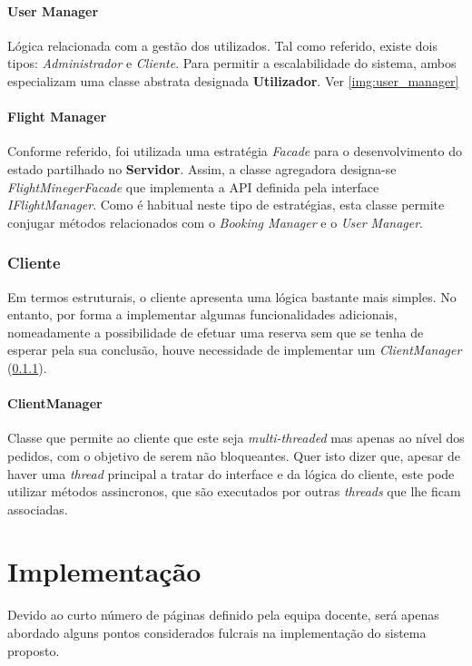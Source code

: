 \documentclass[a4paper,11pt]{scrreprt}
\begin{document}
\subsubsection{User Manager}
Lógica relacionada com a gestão dos utilizados. Tal como referido, existe dois tipos:
\textit{Administrador} e \textit{Cliente}.
Para permitir a escalabilidade do sistema, ambos especializam uma classe abstrata designada
\textbf{Utilizador}. Ver \ref{img:user_manager}

\subsubsection{Flight Manager}
Conforme referido, foi utilizada uma estratégia \textit{Facade} para o desenvolvimento
do estado partilhado no \textbf{Servidor}.
Assim, a classe agregadora designa-se \textit{FlightMinegerFacade} que implementa a API definida
pela interface \textit{IFlightManager}.
Como é habitual neste tipo de estratégias, esta classe permite conjugar métodos relacionados com 
o \textit{Booking Manager} e o \textit{User Manager}.

\subsection{Cliente}
Em termos estruturais, o cliente apresenta uma lógica bastante mais simples.
No entanto, por forma a implementar algumas funcionalidades adicionais, nomeadamente
a possibilidade de efetuar uma reserva sem que se tenha de esperar pela sua conclusão,
houve necessidade de implementar um \textit{ClientManager} (\ref{sec:client_manager}).

\subsubsection{ClientManager} \label{sec:client_manager}
Classe que permite ao cliente que este seja \textit{multi-threaded} mas apenas ao nível dos pedidos,
com o objetivo de serem não bloqueantes.
Quer isto dizer que, apesar de haver uma \textit{thread} principal a tratar do interface
e da lógica do cliente, este pode utilizar métodos assincronos, que são executados por 
outras \textit{threads} que lhe ficam associadas.

\chapter{Implementação}
Devido ao curto número de páginas definido pela equipa docente, será apenas abordado alguns pontos
considerados fulcrais na implementação do sistema proposto.
\end{document}
